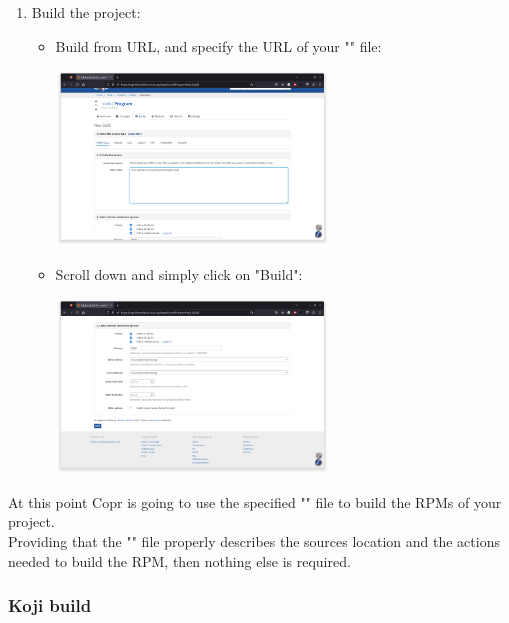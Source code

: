 \begin{enumerate}
\begin{center}
\end{center}
\item Build the project:
\begin{itemize}
\item Build from URL, and specify the URL of your "" file:
\begin{center}
\includegraphics[width=0.6\textwidth,keepaspectratio=true,draft=\ddst]{img/rpms/build-2.eps}
\end{center}
\item Scroll down and simply click on "Build":
\begin{center}
\includegraphics[width=0.6\textwidth,keepaspectratio=true,draft=\ddst]{img/rpms/build-3.eps}
\end{center}
\end{itemize}
\end{enumerate}
At this point Copr is going to use the specified "" file to build the RPMs of your project. \\
Providing that the "" file properly describes the sources location and the actions needed to build the RPM, 
then nothing else is required. 

\subsubsection{Koji build}
\label{kojib}

